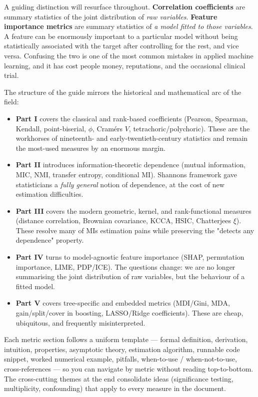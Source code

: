 \documentclass{article}
\providecommand{\tightlist}{\setlength{\itemsep}{0pt}\setlength{\parskip}{0pt}}
\begin{document}
A guiding distinction will resurface throughout. \textbf{Correlation
coefficients} are summary statistics of the joint distribution of
\emph{raw variables}. \textbf{Feature importance metrics} are summary
statistics of \emph{a model fitted to those variables}. A feature can be
enormously important to a particular model without being statistically
associated with the target after controlling for the rest, and vice
versa. Confusing the two is one of the most common mistakes in applied
machine learning, and it has cost people money, reputations, and the
occasional clinical trial.

The structure of the guide mirrors the historical and mathematical arc
of the field:

\begin{itemize}
\tightlist
\item
  \textbf{Part I} covers the classical and rank-based coefficients
  (Pearson, Spearman, Kendall, point-biserial, \(\phi\),
  Cramér\textquotesingle s \(V\), tetrachoric/polychoric). These are the
  workhorses of nineteenth- and early-twentieth-century statistics and
  remain the most-used measures by an enormous margin.
\item
  \textbf{Part II} introduces information-theoretic dependence (mutual
  information, MIC, NMI, transfer entropy, conditional MI).
  Shannon\textquotesingle s framework gave statisticians a \emph{fully
  general} notion of dependence, at the cost of new estimation
  difficulties.
\item
  \textbf{Part III} covers the modern geometric, kernel, and
  rank-functional measures (distance correlation, Brownian covariance,
  KCCA, HSIC, Chatterjee\textquotesingle s \(\xi\)). These resolve many
  of MI\textquotesingle s estimation pains while preserving the "detects
  any dependence" property.
\item
  \textbf{Part IV} turns to model-agnostic feature importance (SHAP,
  permutation importance, LIME, PDP/ICE). The questions change: we are
  no longer summarising the joint distribution of raw variables, but the
  behaviour of a fitted model.
\item
  \textbf{Part V} covers tree-specific and embedded metrics (MDI/Gini,
  MDA, gain/split/cover in boosting, LASSO/Ridge coefficients). These
  are cheap, ubiquitous, and frequently misinterpreted.
\end{itemize}

Each metric section follows a uniform template --- formal definition,
derivation, intuition, properties, asymptotic theory, estimation
algorithm, runnable code snippet, worked numerical example, pitfalls,
when-to-use / when-not-to-use, cross-references --- so you can navigate
by metric without reading top-to-bottom. The cross-cutting themes at the
end consolidate ideas (significance testing, multiplicity, confounding)
that apply to every measure in the document.
\end{document}
